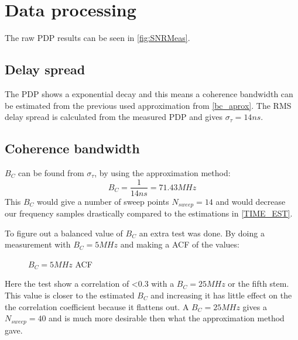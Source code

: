 \section{Data processing}
The raw PDP results can be seen in  \autoref{fig:SNRMeas}.
\subsection{Delay spread}
The PDP shows a exponential decay and this means a coherence bandwidth can be estimated from the previous used approximation from \autoref{bc_aprox}. The RMS delay spread is calculated from the measured PDP and gives $\sigma_{\tau} = 14ns$.

\subsection{Coherence bandwidth}\label{sec:coherence_bandwidth}

$B_C$ can be found from $\sigma_{\tau}$, by using the approximation method:
\begin{equation}
B_C = \frac{1}{14ns} = 71.43 MHz 
\end{equation}
This $B_C$ would give a number of sweep points $N_{sweep} = 14$ and would decrease our  frequency samples drastically compared to the estimations in \autoref{TIME_EST}.

To figure out a balanced value of $B_C$ an extra test was done. By doing a measurement with $B_C = 5MHz$ and making a \gls{ACF} of the values:

\begin{figure}[H]
\centering

\caption{$B_C = 5MHz$ \gls{ACF}} 
\label{fig:coh_test}
\end{figure}

Here the test show a correlation of <0.3 with a $B_C = 25MHz$ or the fifth stem. This value is closer to the estimated $B_C$ and increasing it has little effect on the  the correlation coefficient because it flattens out. A $B_C = 25MHz$ gives a $N_{sweep} = 40$ and is much more desirable then what the approximation method gave.

